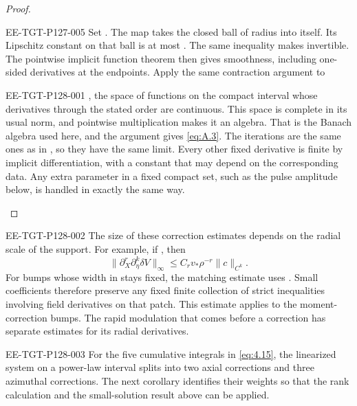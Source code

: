 \begin{proof}
\begin{EESegment}{EE-TGT-P127-005}
Set . The map
 takes the closed
 ball of radius  into itself. Its
Lipschitz constant on that ball is at most
. The same inequality makes
 invertible. The pointwise implicit function
 theorem then gives smoothness, including one-sided derivatives at the endpoints. Apply the
 same contraction argument to
\end{EESegment}
%
\begin{EESegment}{EE-TGT-P128-001}
, the space of functions on the compact interval whose derivatives through the stated order
are continuous. This space is complete in its usual norm, and pointwise multiplication makes it an algebra. That is the
Banach algebra used here, and the argument gives \eqref{eq:A.3}. The iterations are the same ones as
in , so they have the same limit. Every other fixed derivative
is finite by implicit differentiation, with a constant that may depend on the corresponding
data. Any extra parameter in a fixed compact set, such as the pulse amplitude below, is
handled in exactly the same way.
\end{EESegment}
\end{proof}

\begin{EESegment}{EE-TGT-P128-002}
The size of these correction estimates depends on the radial scale of the support. For
example, if , then
\[
\lVert\partial_X^r\partial_\eta^k\delta V\rVert_\infty
\le C_rv_*\rho^{-r}\lVert c\rVert_{C^k}.
\]
For bumps whose width in  stays fixed, the matching estimate
uses . Small coefficients therefore preserve any
fixed finite collection of strict inequalities involving field derivatives on that patch. This
estimate applies to the moment-correction bumps. The rapid modulation that comes before a
correction has separate estimates for its radial derivatives.
\end{EESegment}

\begin{EESegment}{EE-TGT-P128-003}
For the five cumulative integrals in \eqref{eq:4.15}, the linearized system on a power-law
interval splits into two axial corrections and three azimuthal corrections. The next
corollary identifies their weights so that the rank calculation and the small-solution result
above can be applied.
\end{EESegment}

